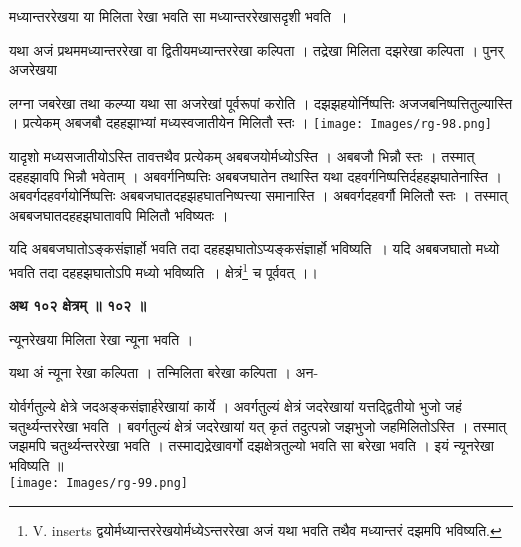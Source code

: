 \documentclass[11pt, openany]{book}
\begin{document}
{\ab मध्यान्तररेखया या मिलिता रेखा भवति सा मध्यान्तररेखासदृशी भवति~। }\\
\vspace{3mm}

यथा अजं प्रथममध्यान्तररेखा वा द्वितीयमध्यान्तररेखा कल्पिता ।
तद्रेखा मिलिता दझरेखा कल्पिता । पुनर्
अजरेखया 
\begin{vwcol}[widths={0.65,0.35}, sep=.8cm, rule=0pt]
लग्ना जबरेखा तथा कल्प्या
यथा सा अजरेखां पूर्वरूपां करोति । दझझहयोर्निष्पत्तिः अजजबनिष्पत्तितुल्यास्ति ।
प्रत्येकम् अबजबौ दहहझाभ्यां मध्यस्वजातीयेन मिलितौ स्तः । 
\texttt{[image: Images/rg-98.png]}
\end{vwcol}
\vspace{-2mm}

\noindent यादृशो मध्यसजातीयोऽस्ति तावत्तथैव प्रत्येकम् अबबजयोर्मध्योऽस्ति । अबबजौ भिन्नौ स्तः । तस्मात् दहहझावपि भिन्नौ भवेताम् ।
अबवर्गनिष्पत्तिः अबबजघातेन तथास्ति यथा
दहवर्गनिष्पत्तिर्दहहझघातेनास्ति । अबवर्गदहवर्गयोर्निष्पत्तिः
अबबजघातदहझहघातनिष्पत्त्या समानास्ति । अबवर्गदहवर्गौ मिलितौ स्तः । तस्मात् अबबजघातदहहझघातावपि मिलितौ भविष्यतः । \\
\vspace{3mm}

यदि अबबजघातोऽङ्कसंज्ञार्हो भवति तदा दहहझघातोऽप्यङ्कसंज्ञार्हो भविष्यति~। यदि अबबजघातो मध्यो भवति तदा दहहझघातोऽपि मध्यो भविष्यति~। क्षेत्रं\renewcommand{\thefootnote}{१}\footnote{{\en V. inserts} द्वयोर्मध्यान्तररेखयोर्मध्येऽन्तररेखा अजं यथा भवति तथैव
मध्यान्तरं दझमपि भविष्यति.} च पूर्ववत् ।। \\
\begin{center}
\textbf{\large अथ १०२ क्षेत्रम् ॥ १०२ ॥}
\end{center}
\vspace{2mm}

{\ab न्यूनरेखया मिलिता रेखा न्यूना भवति । }\\
\vspace{3mm}

 यथा अं न्यूना रेखा कल्पिता । तन्मिलिता बरेखा कल्पिता । अन- 


\newpage
\begin{vwcol}[widths={0.67,0.33}, sep=.8cm, rule=0pt]
\noindent योर्वर्गतुल्ये क्षेत्रे जदअङ्कसंज्ञार्हरेखायां कार्ये । 
अवर्गतुल्यं क्षेत्रं जदरेखायां यत्तद्द्वितीयो भुजो जहं चतुर्थ्यन्तररेखा भवति । बवर्गतुल्यं क्षेत्रं 
जदरेखायां यत् कृतं तदुत्पन्नो जझभुजो जहमिलितोऽस्ति । तस्मात् जझमपि चतुर्थ्यन्तररेखा 
भवति । तस्माद्यद्रेखावर्गो दझक्षेत्रतुल्यो भवति 
सा बरेखा भवति । इयं न्यूनरेखा भविष्यति ॥ \\
\noindent \texttt{[image: Images/rg-99.png]}
\end{vwcol}
\end{document}
